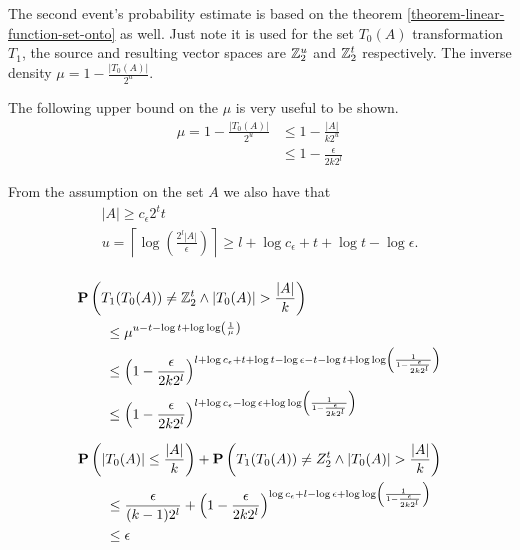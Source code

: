 The second event's probability estimate is based on the theorem \ref{theorem-linear-function-set-onto} as well. Just note it is used for the set $T_0(A)$ transformation $T_1$, the source and resulting vector spaces are $\mathbb{Z}_{2}^{u}$ and $\mathbb{Z}_{2}^{t}$ respectively. The inverse density $\mu = 1 - \frac{|T_0(A)|}{2^u}$.

The following upper bound on the $\mu$ is very useful to be shown.
\[
\begin{split}
\mu = 1 - \frac{|T_0(A)|}{2^u} 
	& \leq 1 - \frac{|A|}{k 2 ^ u} \\
	& \leq 1 - \frac{\epsilon}{2 k 2 ^ l}
\end{split}
\]

From the assumption on the set $A$ we also have that
\begin{gather*}
	|A| \geq c_\epsilon 2^t t \\
	u = \left\lceil \log \left(\frac{2^l |A|}{\epsilon}\right) \right\rceil \geq l + \log c_\epsilon + t + \log t - \log \epsilon \text{.} \\
\end{gather*}

\[
\begin{split}
& \mathbf{P}\left(T_1(T_0(A)) \neq \mathbb{Z}_{2}^{t} \wedge |T_0(A)| > \frac{|A|}{k}\right) \\
	& \qquad \leq \mu ^ {u - t - \log t + \log \log \left(\frac{1}{\mu}\right)} \\
	& \qquad \leq \left(1 - \frac{\epsilon}{2 k 2 ^ l}\right)^{l + \log c_\epsilon + t + \log t - \log \epsilon - t - \log t + \log \log \left(\frac{1}{1 - \frac{\epsilon}{2 k 2 ^ l}}\right)} \\
	& \qquad \leq \left(1 - \frac{\epsilon}{2 k 2 ^ l}\right)^{l + \log c_\epsilon - \log \epsilon + \log \log \left(\frac{1}{1 - \frac{\epsilon}{2 k 2 ^ l}}\right)} \\
\end{split}
\]

\[
\begin{split}
& \mathbf{P}\left(|T_0(A)| \leq \frac{|A|}{k}\right) + \mathbf{P}\left(T_1(T_0(A)) \neq Z_2^t \wedge |T_0(A)| > \frac{|A|}{k}\right) \\ 
	& \qquad \leq \frac{\epsilon}{(k - 1) 2 ^ l} + \left(1 - \frac{\epsilon}{2 k 2^l}\right)^{\log c_\epsilon + l - \log \epsilon + \log \log \left(\frac{1}{1 - \frac{\epsilon}{2 k 2^l}}\right)} \\
	& \qquad \leq \epsilon \\
\end{split}
\]

